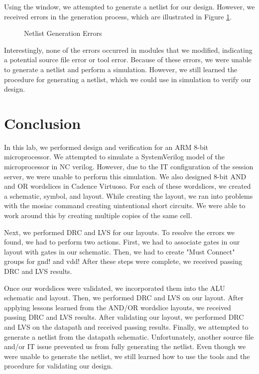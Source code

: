 \documentclass{article}
\begin{document}
	\noindent Using the window, we attempted to generate a netlist for our design. However, we received errors in the generation process, which are illustrated in Figure \ref{fig::netlist_generation_errors}.
	
	\begin{figure}[H]
		\centerline{}
		\caption{Netlist Generation Errors}
		\label{fig::netlist_generation_errors}
	\end{figure}
	
	\noindent Interestingly, none of the errors occurred in modules that we modified, indicating a potential source file error or tool error. Because of these errors, we were unable to generate a netlist and perform a simulation. However, we still learned the procedure for generating a netlist, which we could use in simulation to verify our design.
	
	\section{Conclusion}
	
	In this lab, we performed design and verification for an ARM 8-bit microprocessor. We attempted to simulate a SystemVerilog model of the microprocessor in NC verilog. However, due to the IT configuration of the session server, we were unable to perform this simulation. We also designed 8-bit AND and OR wordslices in Cadence Virtuoso. For each of these wordslices, we created a schematic, symbol, and layout. While creating the layout, we ran into problems with the mosiac command creating uintentional short circuits. We were able to work around this by creating multiple copies of the same cell. 
	
	Next, we performed DRC and LVS for our layouts. To resolve the errors we found, we had to perform two actions. First, we had to associate gates in our layout with gates in our schematic. Then, we had to create "Must Connect" groups for gnd! and vdd! After these steps were complete, we received passing DRC and LVS results. 
	
	Once our wordslices were validated, we incorporated them into the ALU schematic and layout. Then, we performed DRC and LVS on our layout. After applying lessons learned from the AND/OR wordslice layouts, we received passing DRC and LVS results. After validating our layout, we performed DRC and LVS on the datapath and received passing results. Finally, we attempted to generate a netlist from the datapath schematic. Unfortunately, another source file and/or IT issue prevented us from fully generating the netlist. Even though we were unable to generate the netlist, we still learned how to use the tools and the procedure for validating our design.
	
\end{document}
